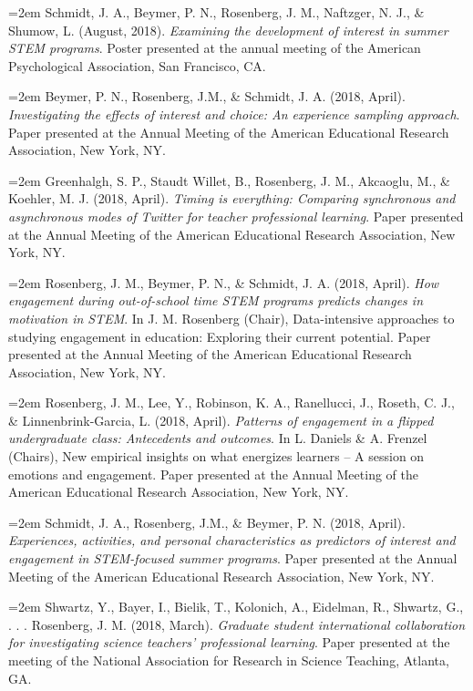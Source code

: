 \documentclass[
  11pt,
]{article}
\begin{document}
\hangindent=2em Schmidt, J. A., Beymer, P. N., Rosenberg, J. M.,
Naftzger, N. J., \& Shumow, L. (August, 2018). \emph{Examining the
development of interest in summer STEM programs}. Poster presented at
the annual meeting of the American Psychological Association, San
Francisco, CA.

\hangindent=2em Beymer, P. N., Rosenberg, J.M., \& Schmidt, J. A. (2018,
April). \emph{Investigating the effects of interest and choice: An
experience sampling approach}. Paper presented at the Annual Meeting of
the American Educational Research Association, New York, NY.

\hangindent=2em Greenhalgh, S. P., Staudt Willet, B., Rosenberg, J. M.,
Akcaoglu, M., \& Koehler, M. J. (2018, April). \emph{Timing is
everything: Comparing synchronous and asynchronous modes of Twitter for
teacher professional learning}. Paper presented at the Annual Meeting of
the American Educational Research Association, New York, NY.

\hangindent=2em Rosenberg, J. M., Beymer, P. N., \& Schmidt, J. A.
(2018, April). \emph{How engagement during out-of-school time STEM
programs predicts changes in motivation in STEM}. In J. M. Rosenberg
(Chair), Data-intensive approaches to studying engagement in education:
Exploring their current potential. Paper presented at the Annual Meeting
of the American Educational Research Association, New York, NY.

\hangindent=2em Rosenberg, J. M., Lee, Y., Robinson, K. A., Ranellucci,
J., Roseth, C. J., \& Linnenbrink-Garcia, L. (2018, April).
\emph{Patterns of engagement in a flipped undergraduate class:
Antecedents and outcomes}. In L. Daniels \& A. Frenzel (Chairs), New
empirical insights on what energizes learners -- A session on emotions
and engagement. Paper presented at the Annual Meeting of the American
Educational Research Association, New York, NY.

\hangindent=2em Schmidt, J. A., Rosenberg, J.M., \& Beymer, P. N. (2018,
April). \emph{Experiences, activities, and personal characteristics as
predictors of interest and engagement in STEM-focused summer programs}.
Paper presented at the Annual Meeting of the American Educational
Research Association, New York, NY.

\hangindent=2em Shwartz, Y., Bayer, I., Bielik, T., Kolonich, A.,
Eidelman, R., Shwartz, G., . . . Rosenberg, J. M. (2018, March).
\emph{Graduate student international collaboration for investigating
science teachers' professional learning}. Paper presented at the meeting
of the National Association for Research in Science Teaching, Atlanta,
GA.
\end{document}
